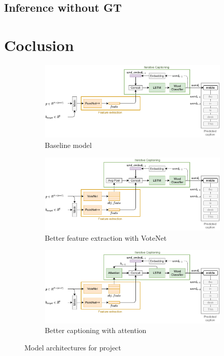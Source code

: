 \documentclass[10pt,twocolumn,letterpaper]{article}
\begin{document}
\subsection{Inference without GT}

\section{Coclusion}

\begin{figure}
	\begin{subfigure}[c]{\textwidth}
		\centering
		\includegraphics[width=\textwidth]{figures/arch_baseline.pdf}
		\caption{Baseline model}
		\label{fig:baseline}
	\end{subfigure}
	\begin{subfigure}[c]{\textwidth}
		\centering
		\includegraphics[width=\textwidth]{figures/arch_votenet.pdf}
		\caption{Better feature extraction with VoteNet}
		\label{fig:votenet}
	\end{subfigure}
	\begin{subfigure}[c]{\textwidth}
		\centering
		\includegraphics[width=\textwidth]{figures/arch_attention.pdf}
		\caption{Better captioning with attention}
		\label{fig:attention}
	\end{subfigure}
	\caption{Model architectures for project}
	\label{fig:architectures}
\end{figure}

{\small


}
\end{document}

